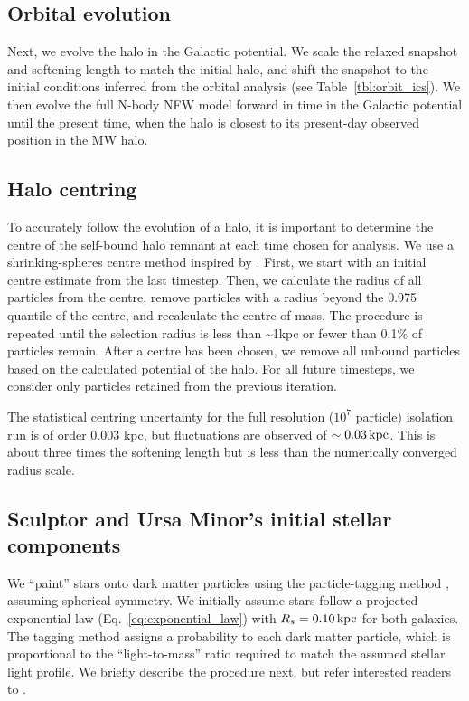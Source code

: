 \subsection{Orbital evolution}\label{orbital-evolution}

Next, we evolve the halo in the Galactic potential. We scale the relaxed
snapshot and softening length to match the initial halo, and shift the
snapshot to the initial conditions inferred from the orbital analysis
(see Table~\ref{tbl:orbit_ics}). We then evolve the full N-body NFW
model forward in time in the Galactic potential until the present time,
when the halo is closest to its present-day observed position in the MW
halo.

\subsection{Halo centring}\label{sec:shrinking_spheres}

To accurately follow the evolution of a halo, it is important to
determine the centre of the self-bound halo remnant at each time chosen
for analysis. We use a shrinking-spheres centre method inspired by
\citet{power+2003}. First, we start with an initial centre estimate from
the last timestep. Then, we calculate the radius of all particles from
the centre, remove particles with a radius beyond the 0.975 quantile of
the centre, and recalculate the centre of mass. The procedure is
repeated until the selection radius is less than \textasciitilde1kpc or
fewer than 0.1\% of particles remain. After a centre has been chosen, we
remove all unbound particles based on the \gadget{} calculated potential
of the halo. For all future timesteps, we consider only particles
retained from the previous iteration.

The statistical centring uncertainty for the full resolution (\(10^7\)
particle) isolation run is of order 0.003 kpc, but fluctuations are
observed of \(\sim 0.03\,{\rm kpc}\). This is about three times the softening
length but is less than the numerically converged radius scale.

\subsection{Sculptor and Ursa Minor's initial stellar
components}\label{sec:painting_stars}

We ``paint'' stars onto dark matter particles using the particle-tagging
method \citep[e.g.,][]{bullock+johnston2005}, assuming spherical
symmetry. We initially assume stars follow a projected exponential law
(Eq.~\ref{eq:exponential_law}) with \(R_s = 0.10\,{\rm kpc}\) for both
galaxies. The tagging method assigns a probability to each dark matter
particle, which is proportional to the ``light-to-mass'' ratio required
to match the assumed stellar light profile. We briefly describe the
procedure next, but refer interested readers to \citet{EP2020}.

